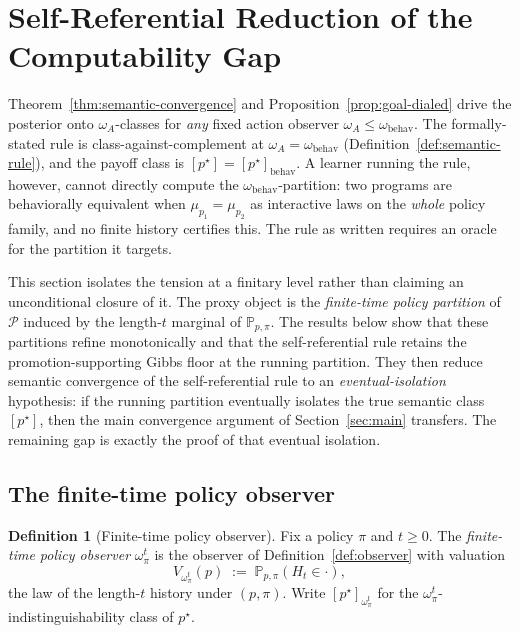 \documentclass[11pt]{article}
\theoremstyle{definition}
\newtheorem{definition}[theorem]{Definition}
\theoremstyle{remark}
\newcommand{\Pcal}{\mathcal{P}}
\newcommand{\Prob}{\mathbb{P}}
\begin{document}
\section{Self-Referential Reduction of the Computability Gap}
\label{sec:self-ref}

Theorem~\ref{thm:semantic-convergence} and Proposition~\ref{prop:goal-dialed} drive the posterior onto $\omega_A$-classes for \emph{any} fixed action observer $\omega_A\le\omega_{\mathrm{behav}}$. The formally-stated rule is class-against-complement at $\omega_A=\omega_{\mathrm{behav}}$ (Definition~\ref{def:semantic-rule}), and the payoff class is $[p^\star]=[p^\star]_{\mathrm{behav}}$. A learner running the rule, however, cannot directly compute the $\omega_{\mathrm{behav}}$-partition: two programs are behaviorally equivalent when $\mu_{p_1}=\mu_{p_2}$ as interactive laws on the \emph{whole} policy family, and no finite history certifies this. The rule as written requires an oracle for the partition it targets.

This section isolates the tension at a finitary level rather than claiming an unconditional closure of it. The proxy object is the \emph{finite-time policy partition} of $\Pcal$ induced by the length-$t$ marginal of $\Prob_{p,\pi}$. The results below show that these partitions refine monotonically and that the self-referential rule retains the promotion-supporting Gibbs floor at the running partition. They then reduce semantic convergence of the self-referential rule to an \emph{eventual-isolation} hypothesis: if the running partition eventually isolates the true semantic class $[p^\star]$, then the main convergence argument of Section~\ref{sec:main} transfers. The remaining gap is exactly the proof of that eventual isolation.

\subsection{The finite-time policy observer}
\label{sec:finite-time-policy-observer}

\begin{definition}[Finite-time policy observer]
\label{def:finite-time-policy-observer}
Fix a policy $\pi$ and $t\ge 0$. The \emph{finite-time policy observer} $\omega_\pi^t$ is the observer of Definition~\ref{def:observer} with valuation
\[
V_{\omega_\pi^t}(p)\;:=\;\Prob_{p,\pi}(H_t\in\cdot),
\]
the law of the length-$t$ history under $(p,\pi)$. Write $[p^\star]_{\omega_\pi^t}$ for the $\omega_\pi^t$-indistinguishability class of $p^\star$.
\end{definition}
\end{document}

